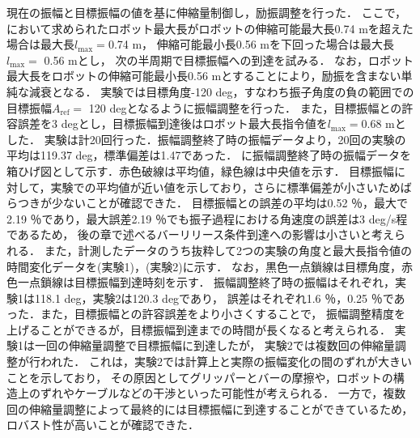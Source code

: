         現在の振幅と目標振幅の値を基に伸縮量制御し，励振調整を行った．
        ここで，において求められたロボット最大長がロボットの伸縮可能最大長0.74 mを超えた場合は最大長$l_{\mathrm{max}} =$0.74 m，
        伸縮可能最小長0.56 mを下回った場合は最大長$l_{\mathrm{max}} =$ 0.56 mとし，
        次の半周期で目標振幅への到達を試みる．
        なお，ロボット最大長をロボットの伸縮可能最小長0.56 mとすることにより，励振を含まない単純な減衰となる．
        実験では目標角度-120 deg，すなわち振子角度の負の範囲での目標振幅$A_{\mathrm{ref}} =$ 120 degとなるように振幅調整を行った．
        また，目標振幅との許容誤差を3 degとし，目標振幅到達後はロボット最大長指令値を$l_{\mathrm{max}} =$0.68 mとした．
        実験は計20回行った．振幅調整終了時の振幅データより，20回の実験の平均は119.37 deg，標準偏差は1.47であった．
        に振幅調整終了時の振幅データを箱ひげ図として示す．赤色破線は平均値，緑色線は中央値を示す．
        目標振幅に対して，実験での平均値が近い値を示しており，さらに標準偏差が小さいためばらつきが少ないことが確認できた．
        目標振幅との誤差の平均は0.52 ％，最大で2.19 ％であり，最大誤差2.19 ％でも振子過程における角速度の誤差は3 deg/s程であるため，
        後の章で述べるバーリリース条件到達への影響は小さいと考えられる．
        また，計測したデータのうち抜粋して2つの実験の角度と最大長指令値の時間変化データを(実験1)，(実験2)に示す．
        なお，黒色一点鎖線は目標角度，赤色一点鎖線は目標振幅到達時刻を示す．
        振幅調整終了時の振幅はそれぞれ，実験1は118.1 deg，実験2は120.3 degであり，
        誤差はそれぞれ1.6 ％，0.25 ％であった．また，目標振幅との許容誤差をより小さくすることで，
        振幅調整精度を上げることができるが，目標振幅到達までの時間が長くなると考えられる．
        実験1は一回の伸縮量調整で目標振幅に到達したが，
        実験2では複数回の伸縮量調整が行われた．
        これは，実験2では計算上と実際の振幅変化の間のずれが大きいことを示しており，
        その原因としてグリッパーとバーの摩擦や，ロボットの構造上のずれやケーブルなどの干渉といった可能性が考えられる．
        一方で，複数回の伸縮量調整によって最終的には目標振幅に到達することができているため，
        ロバスト性が高いことが確認できた．
        





          


